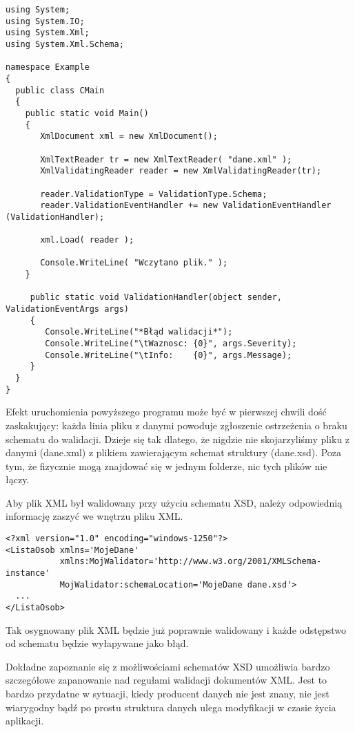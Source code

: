 \begin{scriptsize}
\begin{verbatim}
using System;
using System.IO;
using System.Xml;
using System.Xml.Schema;
 
namespace Example
{
  public class CMain
  {   
    public static void Main()
    {
       XmlDocument xml = new XmlDocument();

       XmlTextReader tr = new XmlTextReader( "dane.xml" );
       XmlValidatingReader reader = new XmlValidatingReader(tr);

       reader.ValidationType = ValidationType.Schema;
       reader.ValidationEventHandler += new ValidationEventHandler (ValidationHandler);

       xml.Load( reader );

       Console.WriteLine( "Wczytano plik." );
    }

     public static void ValidationHandler(object sender, ValidationEventArgs args)
     {
        Console.WriteLine("*Błąd walidacji*");
        Console.WriteLine("\tWaznosc: {0}", args.Severity);
        Console.WriteLine("\tInfo:    {0}", args.Message);
     }
  }
}
\end{verbatim}
\end{scriptsize}

Efekt uruchomienia powyższego programu może być w pierwszej chwili dość zaskakujący: każda linia
pliku z danymi powoduje zgłoszenie ostrzeżenia o braku schematu do walidacji. Dzieje się tak dlatego, że
nigdzie nie skojarzyliśmy pliku z danymi (dane.xml) z plikiem zawierającym schemat struktury (dane.xsd).
Poza tym, że fizycznie mogą znajdować się w jednym folderze, nic tych plików nie łączy. 

Aby plik XML był walidowany przy użyciu schematu XSD, należy odpowiednią informację zaszyć
we wnętrzu pliku XML. 

\begin{scriptsize}
\begin{verbatim}
<?xml version="1.0" encoding="windows-1250"?>
<ListaOsob xmlns='MojeDane' 
           xmlns:MojWalidator='http://www.w3.org/2001/XMLSchema-instance'
           MojWalidator:schemaLocation='MojeDane dane.xsd'>
  ...
</ListaOsob>
\end{verbatim}
\end{scriptsize}

Tak osygnowany plik XML będzie już poprawnie walidowany i każde odstępstwo od schematu będzie
wyłapywane jako błąd. 

Dokładne zapoznanie się z możliwościami schematów XSD umożliwia bardzo szczegółowe
zapanowanie nad regułami walidacji dokumentów XML. Jest to bardzo przydatne w sytuacji, kiedy
producent danych nie jest znany, nie jest wiarygodny bądź po prostu struktura danych ulega modyfikacji
w czasie życia aplikacji.